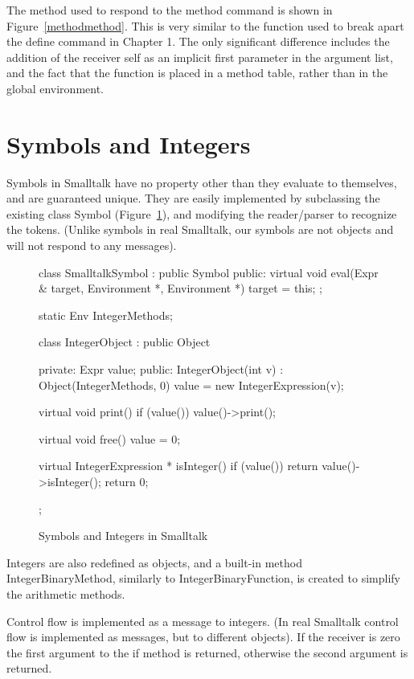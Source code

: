 The method used to respond to the {\sf method} command is shown in
Figure~\ref{methodmethod}.  This is very similar to the function used to break
apart the {\sf define} command in Chapter 1.   The only significant
difference includes the addition of the receiver {\sf self} as an implicit
first parameter in the argument list, and the fact that the function is
placed in a method table, rather than in the global environment.

\section{Symbols and Integers}

Symbols in Smalltalk have no property other than they evaluate to
themselves, and are guaranteed unique.
They are easily implemented by subclassing the existing class {\sf Symbol}
(Figure~\ref{smsymbol}), and modifying the reader/parser to recognize the
tokens.  (Unlike symbols in real Smalltalk, our symbols
are not objects and will not respond to any messages).

\begin{figure}
\begin{cprog}
class SmalltalkSymbol : public Symbol {
public:
	virtual void eval(Expr & target, Environment *, Environment *)
		{ target = this; }
};

static Env IntegerMethods;

class IntegerObject : public Object {
private:
	Expr value;
public:
	IntegerObject(int v) : Object(IntegerMethods, 0) 
		{ value = new IntegerExpression(v); }

	virtual void print()
		{ if (value()) value()->print(); }

	virtual void free()
		{ value = 0; }

	virtual IntegerExpression * isInteger()
		{ if (value()) return value()->isInteger(); return 0; }
};
\end{cprog}
\caption{Symbols and Integers in Smalltalk}\label{smsymbol}
\end{figure}

Integers are also redefined as objects, and a built-in method {\sf
IntegerBinaryMethod}, similarly to {\sf IntegerBinaryFunction}, is created
to simplify the arithmetic methods.

Control flow is implemented as a message to integers.  (In real Smalltalk
control flow is implemented as messages, but to different objects).
If the receiver is zero the first argument to the if method is returned, 
otherwise the second argument is returned.

